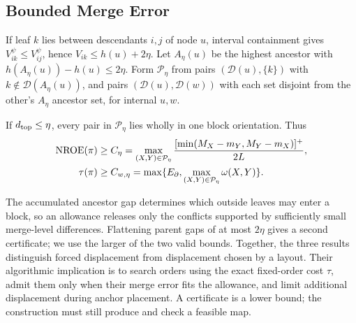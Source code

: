 \subsection{Bounded Merge Error}
If leaf $k$ lies between descendants $i,j$ of node $u$, interval containment gives $V_{ik}^{\psi}\le V_{ij}^{\psi}$, hence $V_{ik}\le h(u)+2\eta$. Let $A_\eta(u)$ be the highest ancestor with $h(A_\eta(u))-h(u)\le2\eta$. Form $\mathcal P_\eta$ from pairs $(\mathcal D(u),\{k\})$ with $k\notin\mathcal D(A_\eta(u))$, and pairs $(\mathcal D(u),\mathcal D(w))$ with each set disjoint from the other's $A_\eta$ ancestor set, for internal $u,w$.
\begin{theorem}\label{thm:chain}
If $d_{\mathrm{top}}\le\eta$, every pair in $\mathcal P_\eta$ lies wholly in one block orientation. Thus
\begin{equation}\label{eq:chainbounds}
\begin{split}
\mathrm{NROE}(\pi)&\ge C_\eta=\max_{(X,Y)\in\mathcal P_\eta}\frac{[\min(M_X-m_Y,M_Y-m_X)]^+}{2L},\\
\tau(\pi)&\ge C_{w,\eta}=\max\{E_\partial,\max_{(X,Y)\in\mathcal P_\eta}\omega(X,Y)\}.
\end{split}
\end{equation}
\end{theorem}
The accumulated ancestor gap determines which outside leaves may enter a block, so an allowance releases only the conflicts supported by sufficiently small merge-level differences. Flattening parent gaps of at most $2\eta$ gives a second certificate; we use the larger of the two valid bounds. Together, the three results distinguish forced displacement from displacement chosen by a layout. Their algorithmic implication is to search orders using the exact fixed-order cost $\tau$, admit them only when their merge error fits the allowance, and limit additional displacement during anchor placement. A certificate is a lower bound; the construction must still produce and check a feasible map.
